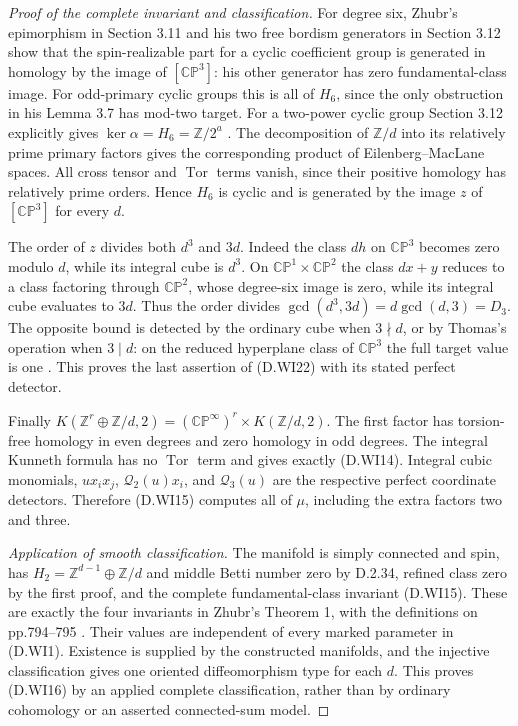 \begin{proof}[Proof of the complete invariant and classification]
For degree six, Zhubr's epimorphism in Section 3.11 and
his two free bordism generators in Section 3.12 show that
the spin-realizable part for a cyclic coefficient group
is generated in homology by the image of
$[\mathbb {CP}^3]$: his other generator has zero
fundamental-class image. For odd-primary cyclic groups
this is all of $H_6$, since the only obstruction in his
Lemma 3.7 has mod-two target. For a two-power cyclic
group Section 3.12 explicitly gives
$\ker\alpha=H_6=\mathbb Z/2^a$
\cite[Lemmas 3.7 and 3.11, and Section 3.12,
pp.805--807]{manZhubr75}.
The decomposition of $\mathbb Z/d$ into its relatively
prime primary factors gives the corresponding product
of Eilenberg--MacLane spaces. All cross tensor and
$\operatorname{Tor}$ terms vanish, since their positive
homology has relatively prime orders. Hence $H_6$ is
cyclic and is generated by the image $z$ of
$[\mathbb {CP}^3]$ for every $d$.

The order of $z$ divides both $d^3$ and $3d$.
Indeed the class $d h$ on $\mathbb {CP}^3$ becomes zero
modulo $d$, while its integral cube is $d^3$.
On $\mathbb {CP}^1\times\mathbb {CP}^2$ the class
$d x+y$ reduces to a class factoring through
$\mathbb {CP}^2$, whose degree-six image is zero,
while its integral cube evaluates to $3d$.
Thus the order divides
$\gcd(d^3,3d)=d\gcd(d,3)=D_3$.
The opposite bound is detected by the ordinary cube when
$3\nmid d$, or by Thomas's operation when $3\mid d$:
on the reduced hyperplane class of $\mathbb {CP}^3$
the full target value is one
\cite[equation (2.8), p.267]{ffThomas56}.
This proves the last assertion of (D.WI22) with its
stated perfect detector.

Finally
$K(\mathbb Z^r\oplus\mathbb Z/d,2)
 =(\mathbb {CP}^{\infty})^r\times K(\mathbb Z/d,2)$.
The first factor has torsion-free homology in even
degrees and zero homology in odd degrees. The integral
Kunneth formula has no $\operatorname{Tor}$ term and
gives exactly (D.WI14). Integral cubic monomials,
$u x_i x_j$, $\mathcal Q_2(u)x_i$, and
$\mathcal Q_3(u)$ are the respective perfect coordinate
detectors. Therefore (D.WI15) computes all of $\mu$,
including the extra factors two and three.

\emph{Application of smooth classification.}
The manifold is simply connected and spin, has
$H_2=\mathbb Z^{d-1}\oplus\mathbb Z/d$ and middle Betti
number zero by D.2.34, refined class zero by the first
proof, and the complete fundamental-class invariant
(D.WI15). These are exactly the four invariants in
Zhubr's Theorem 1, with the definitions on pp.794--795
\cite[Theorem 1]{manZhubr75}. Their values are independent
of every marked parameter in (D.WI1).
Existence is supplied by the constructed manifolds,
and the injective classification gives one oriented
diffeomorphism type for each $d$. This proves (D.WI16)
by an applied complete classification, rather than by
ordinary cohomology or an asserted connected-sum model.
\end{proof}

